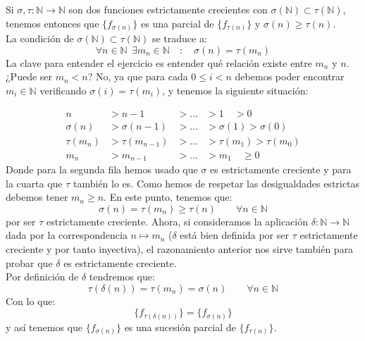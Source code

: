 \begin{ejercicio}
    Si $\sigma,\tau:\mathbb{N}\to \mathbb{N}$ son dos funciones estrictamente crecientes con $\sigma(\mathbb{N})\subset \tau(\mathbb{N})$, tenemos entonces que $\{f_{\sigma(n)}\}$ es una parcial de $\{f_{\tau(n)}\}$ y $\sigma(n)\geq \tau(n)$.\\

    \noindent
    La condición de $\sigma(\mathbb{N})\subset \tau(\mathbb{N})$ se traduce a:
    \begin{equation*}
        \forall n\in \mathbb{N}~~\exists m_n\in \mathbb{N} \quad :\quad \sigma(n) = \tau(m_n)
    \end{equation*}
    La clave para entender el ejercicio es entender qué relación existe entre $m_n$ y $n$. ¿Puede ser $m_n < n$? No, ya que para cada $0\leq i < n$ debemos poder encontrar $m_i \in \mathbb{N}$ verificando $\sigma(i) = \tau(m_i)$, y tenemos la siguiente situación:

    \[
    \begin{aligned}
    n &> n-1 &> \ldots &> 1 \quad > 0 \\
    \sigma(n) &> \sigma(n-1) &> \ldots &> \sigma(1) > \sigma(0) \\
    \tau(m_n) &> \tau(m_{n-1}) &> \ldots &> \tau(m_1) > \tau(m_0) \\
    m_n &> m_{n-1} &> \ldots &> m_1 \quad \ge 0
    \end{aligned}
    \]
    \noindent
    Donde para la segunda fila hemos usado que $\sigma$ es estrictamente creciente y para la cuarta que $\tau$ también lo es. Como hemos de respetar las desigualdades estrictas debemos tener $m_n\geq n$. En este punto, tenemos que:
    \begin{equation*}
        \sigma(n) = \tau(m_n) \geq \tau(n) \qquad \forall n\in \mathbb{N}
    \end{equation*}
    por ser $\tau$ estrictamente creciente. Ahora, si consideramos la aplicación $\delta:\mathbb{N}\to \mathbb{N}$ dada por la correspondencia $n\longmapsto m_n$ ($\delta$ está bien definida por ser $\tau$ estrictamente creciente y por tanto inyectiva), el razonamiento anterior nos sirve también para probar que $\delta$ es estrictamente creciente.\\

    \noindent
    Por definición de $\delta$ tendremos que:
    \begin{equation*}
        \tau(\delta(n)) = \tau(m_n) = \sigma(n) \qquad \forall n\in \mathbb{N}
    \end{equation*}
    Con lo que:
    \begin{equation*}
        \{f_{\tau(\delta(n))}\} = \{f_{\sigma(n)}\}
    \end{equation*}
    y así tenemos que $\{f_{\sigma(n)}\}$ es una sucesión parcial de $\{f_{\tau(n)}\}$.
\end{ejercicio}


